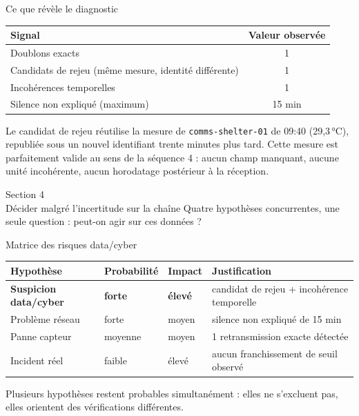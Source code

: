 \documentclass[aspectratio=169]{beamer}
\begin{document}
\begin{frame}{Ce que révèle le diagnostic}
  \small
  \begin{center}
  \begin{tabular}{@{}lc@{}}
    \toprule
    Signal & Valeur observée \\
    \midrule
    Doublons exacts & 1 \\
    Candidats de rejeu (même mesure, identité différente) & 1 \\
    Incohérences temporelles & 1 \\
    Silence non expliqué (maximum) & 15 min \\
    \bottomrule
  \end{tabular}
  \end{center}
  \vfill
  \normalsize Le candidat de rejeu réutilise la mesure de \texttt{comms-shelter-01} de 09:40 (29,3\,°C), republiée sous un nouvel identifiant trente minutes plus tard. Cette mesure est parfaitement valide au sens de la séquence 4 : aucun champ manquant, aucune unité incohérente, aucun horodatage postérieur à la réception.
\end{frame}

\begin{frame}[plain]
  \centering
  \Huge Section 4\\[3mm]
  \Large Décider malgré l'incertitude sur la chaîne
  \vfill
  \normalsize Quatre hypothèses concurrentes, une seule question : peut-on agir sur ces données ?
\end{frame}

\begin{frame}{Matrice des risques data/cyber}
  \small
  \begin{center}
  \begin{tabular}{@{}llll@{}}
    \toprule
    Hypothèse & Probabilité & Impact & Justification \\
    \midrule
    \textbf{Suspicion data/cyber} & \textbf{forte} & \textbf{élevé} & candidat de rejeu + incohérence temporelle \\
    Problème réseau & forte & moyen & silence non expliqué de 15 min \\
    Panne capteur & moyenne & moyen & 1 retransmission exacte détectée \\
    Incident réel & faible & élevé & aucun franchissement de seuil observé \\
    \bottomrule
  \end{tabular}
  \end{center}
  \vfill
  \normalsize Plusieurs hypothèses restent probables simultanément : elles ne s'excluent pas, elles orientent des vérifications différentes.
\end{frame}
\end{document}
